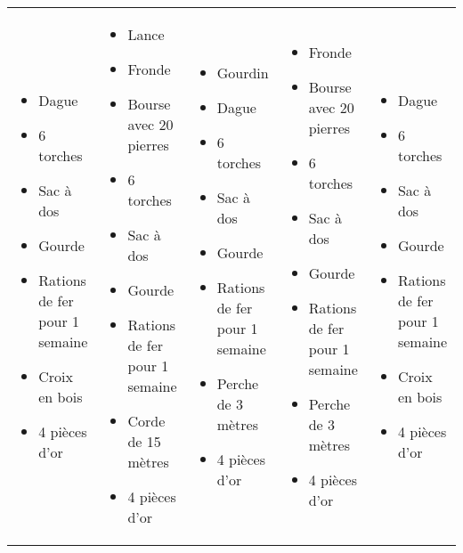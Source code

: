 \begin{tabularx}{\textwidth}{|X|X|X|X|X|}
  \begin{itemize}
    \item Dague
    \item 6 torches
    \item Sac à dos
    \item Gourde
    \item Rations de fer pour 1 semaine
    \item Croix en bois
    \item 4 pièces d'or
  \end{itemize}
  &
  \begin{itemize}
    \item Lance
    \item Fronde
    \item Bourse avec 20 pierres
    \item 6 torches
    \item Sac à dos
    \item Gourde
    \item Rations de fer pour 1 semaine
    \item Corde de 15 mètres
    \item 4 pièces d'or
  \end{itemize}
  &
  \begin{itemize}
    \item Gourdin
    \item Dague
    \item 6 torches
    \item Sac à dos
    \item Gourde
    \item Rations de fer pour 1 semaine
    \item Perche de 3 mètres
    \item 4 pièces d'or
  \end{itemize}
  &
  \begin{itemize}
    \item Fronde
    \item Bourse avec 20 pierres
    \item 6 torches
    \item Sac à dos
    \item Gourde
    \item Rations de fer pour 1 semaine
    \item Perche de 3 mètres
    \item 4 pièces d'or
  \end{itemize}
  &
  \begin{itemize}
    \item Dague
    \item 6 torches
    \item Sac à dos
    \item Gourde
    \item Rations de fer pour 1 semaine
    \item Croix en bois
    \item 4 pièces d'or
  \end{itemize}
\end{tabularx}
